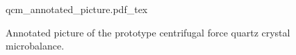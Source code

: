 \begin{figure}[ht]
\centering
{qcm_annotated_picture.pdf_tex}
\caption{Annotated picture of the prototype centrifugal force quartz
crystal microbalance.}
\end{figure}

